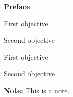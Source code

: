 \thispagestyle{empty}

\begin{center}
  \textbf{\Large Preface}
\end{center}

\begin{objectiveslist}
  \item First objective
  \item Second objective
\end{objectiveslist}

\begin{contributionslist}
  \item First objective
  \item Second objective
\end{contributionslist}

\begin{mdframed}[backgroundcolor=gray!20]
  \textbf{Note:} This is a note.
\end{mdframed}